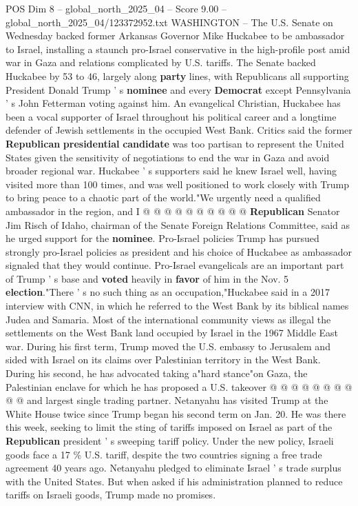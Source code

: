 \begin{textsample}{POS Dim 8 – global\_north\_2025\_04 – Score 9.00 – global\_north\_2025\_04/123372952.txt}  \label{ex:f8_pos_371}
WASHINGTON -- The U.S.
Senate on Wednesday backed former Arkansas Governor Mike Huckabee to be ambassador to Israel, installing a staunch pro-Israel conservative in the high-profile post amid war in Gaza and relations complicated by U.S. tariffs.
The Senate backed Huckabee by 53 to 46, largely along \textbf{party} lines, with Republicans all supporting President Donald Trump ' s \textbf{nominee} and every \textbf{Democrat} except Pennsylvania ' s John Fetterman voting against him.
An evangelical Christian, Huckabee has been a vocal supporter of Israel throughout his political career and a longtime defender of Jewish settlements in the occupied West Bank.
Critics said the former \textbf{Republican} \textbf{presidential} \textbf{candidate} was too partisan to represent the United States given the sensitivity of negotiations to end the war in Gaza and avoid broader regional war.
Huckabee ' s supporters said he knew Israel well, having visited more than 100 times, and was well positioned to work closely with Trump to bring peace to a chaotic part of the world."We urgently need a qualified ambassador in the region, and I @ @ @ @ @ @ @ @ @ @ \textbf{Republican} Senator Jim Risch of Idaho, chairman of the Senate Foreign Relations Committee, said as he urged support for the \textbf{nominee}.
Pro-Israel policies Trump has pursued strongly pro-Israel policies as president and his choice of Huckabee as ambassador signaled that they would continue.
Pro-Israel evangelicals are an important part of Trump ' s base and \textbf{voted} heavily in \textbf{favor} of him in the Nov. 5 \textbf{election}."There ' s no such thing as an occupation,"Huckabee said in a 2017 interview with CNN, in which he referred to the West Bank by its biblical names Judea and Samaria.
Most of the international community views as illegal the settlements on the West Bank land occupied by Israel in the 1967 Middle East war.
During his first term, Trump moved the U.S. embassy to Jerusalem and sided with Israel on its claims over Palestinian territory in the West Bank.
During his second, he has advocated taking a"hard stance"on Gaza, the Palestinian enclave for which he has proposed a U.S. takeover @ @ @ @ @ @ @ @ @ @ and largest single trading partner.
Netanyahu has visited Trump at the White House twice since Trump began his second term on Jan. 20.
He was there this week, seeking to limit the sting of tariffs imposed on Israel as part of the \textbf{Republican} president ' s sweeping tariff policy.
Under the new policy, Israeli goods face a 17 \% U.S. tariff, despite the two countries signing a free trade agreement 40 years ago.
Netanyahu pledged to eliminate Israel ' s trade surplus with the United States.
But when asked if his administration planned to reduce tariffs on Israeli goods, Trump made no promises.

\end{textsample}
